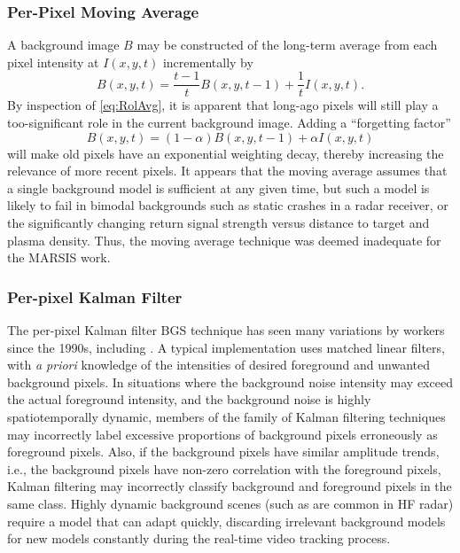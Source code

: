 \subsubsection{Per-Pixel Moving Average}
A background image $B$ may be constructed of the long-term average from each pixel intensity at $I(x,y,t)$ incrementally \citep{friedman1997} by 
\begin{equation} \label{eq:RolAvg}
B(x,y,t) = \frac{t-1}{t}B(x,y,t-1)+\frac{1}{t}I(x,y,t).
\end{equation}
By inspection of \eqref{eq:RolAvg}, it is apparent that long-ago pixels will still play a too-significant role in the current background image.
Adding a ``forgetting factor'' \citep{friedman1997} 
\begin{equation}\label{eq:forgetRol}
B(x,y,t)=(1-\alpha)B(x,y,t-1)+\alpha I(x,y,t)
\end{equation}  
will make old pixels have an exponential weighting decay, thereby increasing the relevance of more recent pixels. 
It appears that the moving average assumes that a single background model is sufficient at any given time, but such a model is likely to fail in bimodal backgrounds such as static crashes in a radar receiver, or the significantly changing return signal strength versus distance to target and plasma density. 
Thus, the moving average technique was deemed inadequate for the MARSIS work.

\FloatBarrier
\subsubsection{Per-pixel Kalman Filter}
The per-pixel Kalman filter BGS technique has seen many variations by workers since the 1990s, including \citet{ridder1995,koller1994a,koller1994b}.
A typical implementation uses matched linear filters, with \textit{a priori} knowledge of the intensities of desired foreground and unwanted background pixels. 
In situations where the background noise intensity may exceed the actual foreground intensity, and the background noise is highly spatiotemporally dynamic, members of the family of Kalman filtering techniques may incorrectly label excessive proportions of background pixels erroneously as foreground pixels. 
Also, if the background pixels have similar amplitude trends, i.e., the background pixels have non-zero correlation with the foreground pixels, Kalman filtering may incorrectly classify background and foreground pixels in the same class.
Highly dynamic background scenes (such as are common in HF radar) require a model that can adapt quickly, discarding irrelevant background models for new models constantly during the real-time video tracking process.

